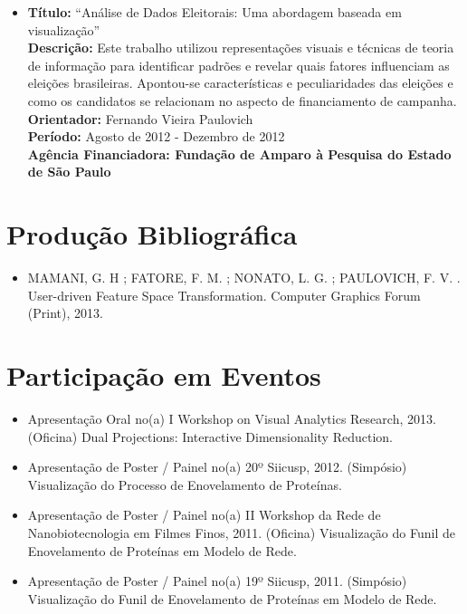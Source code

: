 \documentclass[12pt]{article}
\begin{document}
\begin{itemize}
 \item \textbf{Título:} ``Análise de Dados Eleitorais: Uma
        abordagem baseada em visualização''\\ 
        \textbf{Descrição:} Este
        trabalho utilizou representações visuais e técnicas
        de teoria de informação para identificar padrões e
        revelar quais fatores influenciam as eleições
        brasileiras. Apontou-se características e
        peculiaridades das eleições e como os candidatos se
        relacionam no aspecto de financiamento de campanha. \\
        \textbf{Orientador:} Fernando Vieira Paulovich\\ 
        \textbf{Período:} Agosto de 2012 - Dezembro de 2012\\ 
        \textbf{Agência Financiadora: Fundação de Amparo à Pesquisa do
        Estado de São Paulo}\\ 
        
\end{itemize}


\section{Produção Bibliográfica}

\begin{itemize}

    \item MAMANI, G. H ; FATORE, F. M. ; NONATO, L. G. ;
        PAULOVICH, F. V. . User-driven Feature Space
        Transformation. Computer Graphics Forum (Print),
        2013.

\end{itemize}

\section{Participação em Eventos}

\begin{itemize}

    \item Apresentação Oral no(a) I Workshop on Visual
        Analytics Research, 2013. (Oficina)
        Dual Projections: Interactive Dimensionality
        Reduction.

    \item Apresentação de Poster / Painel no(a) 20º Siicusp,
        2012. (Simpósio)
        Visualização do Processo de Enovelamento de
        Proteínas.

    \item  Apresentação de Poster / Painel no(a) II Workshop
        da Rede de Nanobiotecnologia em Filmes Finos, 2011.
        (Oficina)
        Visualização do Funil de Enovelamento de Proteínas
        em Modelo de Rede.

    \item  Apresentação de Poster / Painel no(a) 19º
        Siicusp, 2011. (Simpósio)
        Visualização do Funil de Enovelamento de Proteínas
        em Modelo de Rede.

\end{itemize}
\end{document}
